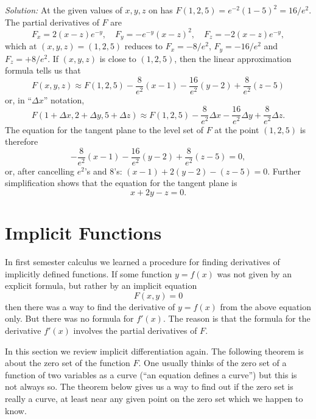 \textit{Solution: } At the given values of $x, y, z$ on has $F(1, 2, 5) =
e^{-2}(1-5)^2 = 16/e^2$.  The partial derivatives of $F$ are
\[
F_x = 2(x-z)e^{-y}, \quad F_y = -e^{-y}(x-z)^2, \quad F_z = -2(x-z)e^{-y},
\]
which at $(x, y, z) = (1, 2, 5)$ reduces to $F_x = -8/e^2$, $F_y = -16/e^2$ and
$F_z = +8/e^2$.  If $(x, y, z)$ is close to $(1, 2, 5)$, then the linear
approximation formula tells us that
\[
F(x, y, z) \approx F(1, 2, 5) -\frac8{e^2} (x-1) -\frac{16}{e^2} (y-2) +
\frac8{e^2} (z-5)
\]
or, in ``$\Delta x$'' notation, %
\[
F(1+\Delta x, 2+\Delta y, 5+\Delta z) \approx F(1, 2, 5) -\frac8{e^2} \Delta x
-\frac{16}{e^2} \Delta y + \frac8{e^2} \Delta z.
\]
The equation for the tangent plane to the level set of $F$ at the point
$(1,2,5)$ is therefore
\[
-\frac8{e^2} (x-1) -\frac{16}{e^2} (y-2) + \frac8{e^2} (z-5)=0,
\]
or, after cancelling ${e^2}$'s and $8$'s: $(x-1) + 2(y-2) -(z-5) = 0$.  Further
simplification shows that the equation for the tangent plane is
\[
x+2y-z = 0.
\]

\section{Implicit Functions}     
In first semester calculus we learned a procedure for finding derivatives of
implicitly defined functions.  If some function $y=f(x)$ was not given by an
explicit formula, but rather by an implicit equation
\begin{equation}
  F(x, y)=0
  \label{eq:implicit}
\end{equation}
then there was a way to find the derivative of $y=f(x)$ from the above equation
only.  But there was no formula for $f'(x)$.  The reason is that the formula for
the derivative $f'(x)$ involves the partial derivatives of $F$.

In this section we review implicit differentiation again.  The following theorem
is about the zero set of the function $F$.  One usually thinks of the zero set
of a function of two variables as a curve (``an equation defines a curve'') but
this is not always so.  The theorem below gives us a way to find out if the zero
set is really a curve, at least near any given point on the zero set which we
happen to know.

